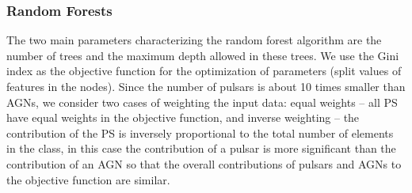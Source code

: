 \subsubsection{Random Forests}

The two main parameters characterizing the random forest algorithm are the number of trees and the maximum depth allowed in these trees. 
We use the Gini index as the objective function for the optimization of parameters (split values of features in the nodes).
Since the number of pulsars is about 10 times smaller than AGNs,
we consider two cases of weighting the input data:
equal weights -- all PS have equal weights in the objective function, and inverse weighting -- the contribution of the PS is inversely proportional to the total number of elements in the class, in this case the contribution of a pulsar is more significant than the contribution of an AGN so that the overall contributions of pulsars and AGNs to the objective function are similar.

